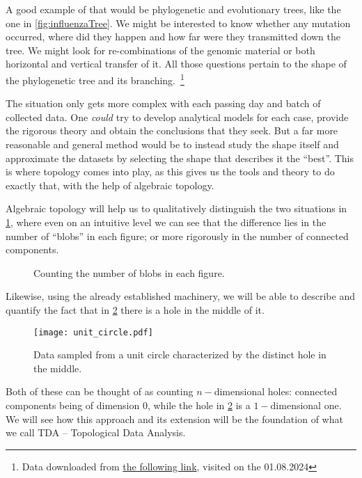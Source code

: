 A good example of that would be phylogenetic and evolutionary trees, like the one in \ref{fig:influenzaTree}. We might be interested to know whether any mutation occurred, where did they happen and how far were they transmitted down the tree. We might look for re-combinations of the genomic material or both horizontal and vertical transfer of it. All those questions pertain to the shape of the phylogenetic tree and its branching.\
\footnote{Data downloaded from \href{https://datadryad.org/stash/dataset/doi:10.5061/dryad.v15v0}{the following link},
visited on the 01.08.2024}
\par
The situation only gets more complex with each passing day and batch of collected data. One \textit{could} try to develop analytical models for each case, provide the rigorous theory and obtain the conclusions that they seek. But a far more reasonable and general method would be to instead study the shape itself and approximate the datasets by selecting the shape that describes it the ``best''. This is where topology comes into play, as this gives us the tools and theory to do exactly that, with the help of algebraic topology.
\par
Algebraic topology will help us to qualitatively distinguish the two situations in \ref{fig:Blobs}, where even on an intuitive level we can see that the difference lies in the number of ``blobs'' in each figure; or more rigorously in the number of connected components.

\begin{figure}[h]
  \centering
  \qquad
  \caption{Counting the number of blobs in each figure.}
  \label{fig:Blobs}
\end{figure}

Likewise, using the already established machinery, we will be able to describe and quantify the fact that in \ref{fig:unit_circle} there is a hole in the middle of it.

\begin{figure}[h]
  \caption{Data sampled from a unit circle characterized by the distinct hole in the middle.}
  \texttt{[image: unit\_circle.pdf]}
  \centering
  \label{fig:unit_circle}
\end{figure}

Both of these can be thought of as counting $n-$dimensional holes: connected components being of dimension $0$, while the hole in \ref{fig:unit_circle} is a $1-$dimensional one. We will see how this approach and its extension will be the foundation of what we call TDA -- Topological Data Analysis.
